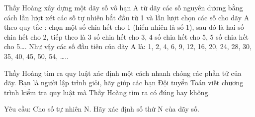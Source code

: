 Thầy Hoàng xây dựng một dãy số vô hạn A từ dãy các số nguyên dương bằng cách lần lượt xét các số tự nhiên bắt đầu từ 1 và lần lượt chọn các số cho dãy A theo quy tắc : chọn một số chia hết cho 1 (hiển nhiên là số 1),  sau đó là hai số chia hết cho 2, tiếp theo là 3 số chia hết cho 3, 4 số chia hết cho 5, 5 số chia hết cho 5…. Như vậy các số đầu tiên của dãy A là: 1, 2, 4, 6, 9, 12, 16, 20, 24, 28, 30, 35, 40, 45, 50, 54, …..  

   Thầy Hoàng tìm ra quy luật xác định một cách nhanh chóng các phần tử của dãy. Bạn là người lập trình giỏi, hãy giúp các bạn Đội tuyển Toán viết chương trình kiểm tra quy luật mà Thầy Hoàng tìm ra có đúng hay không.  

   Yêu cầu: Cho số tự nhiên N. Hãy xác định số thứ N của dãy số.  

\